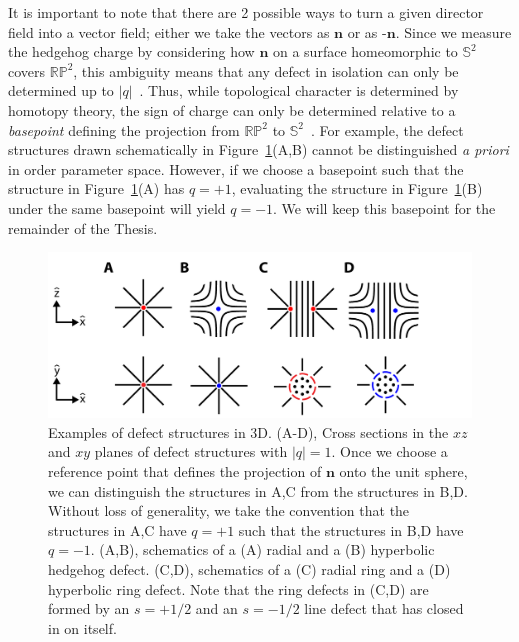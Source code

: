 It is important to note that there are 2 possible ways to turn a given director field into a vector field; either we take the vectors as $\mathbf{n}$ or as -$\mathbf{n}$.
Since we measure the hedgehog charge by considering how $\mathbf{n}$ on a surface homeomorphic to $\mathbb{S}^2$ covers $\mathbb{RP}^2$, this ambiguity means that any defect in isolation can only be determined up to $|q|$~\cite{RN153}.
Thus, while topological character is determined by homotopy theory, the sign of charge can only be determined relative to a \emph{basepoint} defining the projection from $\mathbb{R}\mathbb{P}^2$ to $\mathbb{S}^2$~\cite{RN153}.
For example, the defect structures drawn schematically in Figure~\ref{f:2-3DMeas}(A,B) cannot be distinguished \emph{a priori} in order parameter space.
However, if we choose a basepoint such that the structure in Figure~\ref{f:2-3DMeas}(A) has $q = +1$, evaluating the structure in Figure~\ref{f:2-3DMeas}(B) under the same basepoint will yield $q = -1$.
We will keep this basepoint for the remainder of the Thesis.
\begin{figure}[h]
  \centering
  \includegraphics{figures/C2/Ch2-Figs_3DMeas.png}
  \caption{Examples of defect structures in 3D.
  (A-D), Cross sections in the $xz$ and $xy$ planes of defect structures with $|q| = 1$.
  Once we choose a reference point that defines the projection of $\mathbf{n}$ onto the unit sphere, we can distinguish the structures in A,C from the structures in B,D.
  Without loss of generality, we take the convention that the structures in A,C have $q = +1$ such that the structures in B,D have $q = -1$.
  (A,B), schematics of a (A) radial and a (B) hyperbolic hedgehog defect.
  (C,D), schematics of a (C) radial ring and a (D) hyperbolic ring defect.
  Note that the ring defects in (C,D) are formed by an $s = +1/2 $ and an $s = -1/2$ line defect that has closed in on itself.}\label{f:2-3DMeas}
\end{figure}

